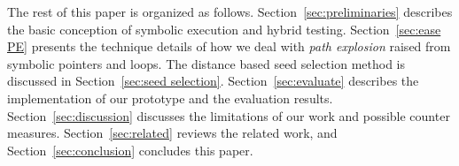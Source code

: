 The rest of this paper is organized as follows. 
 Section~\ref{sec:preliminaries} describes the basic conception of symbolic execution and hybrid testing. 
 Section~\ref{sec:ease PE} presents the technique details of how we deal with \textit{path explosion} raised from symbolic pointers and loops. The distance based seed selection method is discussed in Section~\ref{sec:seed selection}. Section~\ref{sec:evaluate} describes the implementation of our prototype and the evaluation results. Section~\ref{sec:discussion} discusses the limitations of our work and possible counter measures. Section~\ref{sec:related} reviews the related work, and Section~\ref{sec:conclusion} concludes this paper.
